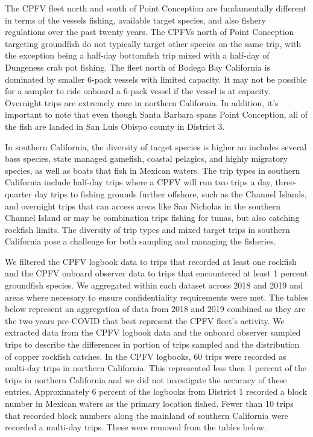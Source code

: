 \documentclass[11pt,
  english,
  letterpaper,
]{article}
\begin{document}
The CPFV fleet north and south of Point Conception are fundamentally different in terms of the vessels fishing, available target species, and also fishery regulations over the past twenty years. The CPFVs north of Point Conception targeting groundfish do not typically target other species on the same trip, with the exception being a half-day bottomfish trip mixed with a half-day of Dungeness crab pot fishing. The fleet north of Bodega Bay California is dominated by smaller 6-pack vessels with limited capacity. It may not be possible for a sampler to ride onboard a 6-pack vessel if the vessel is at capacity. Overnight trips are extremely rare in northern California. In addition, it's important to note that even though Santa Barbara spans Point Conception, all of the fish are landed in San Luis Obispo county in District 3.

In southern California, the diversity of target species is higher an includes several bass species, state managed gamefish, coastal pelagics, and highly migratory species, as well as boats that fish in Mexican waters. The trip types in southern California include half-day trips where a CPFV will run two trips a day, three-quarter day trips to fishing grounds further offshore, such as the Channel Islands, and overnight trips that can access areas like San Nicholas in the southern Channel Island or may be combination trips fishing for tunas, but also catching rockfish limits. The diversity of trip types and mixed target trips in southern California pose a challenge for both sampling and managing the fisheries.

We filtered the CPFV logbook data to trips that recorded at least one rockfish and the CPFV onboard observer data to trips that encountered at least 1 percent groundfish species. We aggregated within each dataset across 2018 and 2019 and areas where necessary to ensure confidentiality requirements were met. The tables below represent an aggregation of data from 2018 and 2019 combined as they are the two years pre-COVID that best represent the CPFV fleet's activity. We extracted data from the CPFV logbook data and the onboard observer sampled trips to describe the differences in portion of trips sampled and the distribution of copper rockfish catches. In the CPFV logbooks, 60 trips were recorded as multi-day trips in northern California. This represented less then 1 percent of the trips in northern California and we did not investigate the accuracy of these entries. Approximately 6 percent of the logbooks from District 1 recorded a block number in Mexican waters as the primary location fished. Fewer than 10 trips that recorded block numbers along the mainland of southern California were recorded a multi-day trips. These were removed from the tables below.
\end{document}
